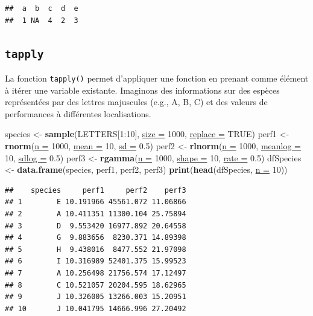 \documentclass[twoside,symmetric]{book}
\newenvironment{Shaded}{}{}
\newcommand{\DataTypeTok}[1]{\underline{#1}}
\newcommand{\DecValTok}[1]{#1}
\newcommand{\FloatTok}[1]{#1}
\newcommand{\KeywordTok}[1]{\textbf{#1}}
\newcommand{\NormalTok}[1]{#1}
\newcommand{\OperatorTok}[1]{#1}
\newcommand{\OtherTok}[1]{#1}
\newcommand{\StringTok}[1]{#1}
\begin{document}
\begin{verbatim}
##  a  b  c  d  e 
##  1 NA  4  2  3
\end{verbatim}

\hypertarget{l17tapply}{%
\subsection{\texorpdfstring{\texttt{tapply}}{tapply}}\label{l17tapply}}

La fonction \texttt{tapply()} permet d'appliquer une fonction en prenant comme élément à itérer une variable existante. Imaginons des informations sur des espèces représentées par des lettres majuscules (e.g., A, B, C) et des valeurs de performances à différentes localisations.

\begin{Shaded}
\begin{Highlighting}[]
\NormalTok{species <-}\StringTok{ }\KeywordTok{sample}\NormalTok{(LETTERS[}\DecValTok{1}\OperatorTok{:}\DecValTok{10}\NormalTok{], }\DataTypeTok{size =} \DecValTok{1000}\NormalTok{, }\DataTypeTok{replace =} \OtherTok{TRUE}\NormalTok{)}
\NormalTok{perf1 <-}\StringTok{ }\KeywordTok{rnorm}\NormalTok{(}\DataTypeTok{n =} \DecValTok{1000}\NormalTok{, }\DataTypeTok{mean =} \DecValTok{10}\NormalTok{, }\DataTypeTok{sd =} \FloatTok{0.5}\NormalTok{)}
\NormalTok{perf2 <-}\StringTok{ }\KeywordTok{rlnorm}\NormalTok{(}\DataTypeTok{n =} \DecValTok{1000}\NormalTok{, }\DataTypeTok{meanlog =} \DecValTok{10}\NormalTok{, }\DataTypeTok{sdlog =} \FloatTok{0.5}\NormalTok{)}
\NormalTok{perf3 <-}\StringTok{ }\KeywordTok{rgamma}\NormalTok{(}\DataTypeTok{n =} \DecValTok{1000}\NormalTok{, }\DataTypeTok{shape =} \DecValTok{10}\NormalTok{, }\DataTypeTok{rate =} \FloatTok{0.5}\NormalTok{)}
\NormalTok{dfSpecies <-}\StringTok{ }\KeywordTok{data.frame}\NormalTok{(species, perf1, perf2, perf3)}
\KeywordTok{print}\NormalTok{(}\KeywordTok{head}\NormalTok{(dfSpecies, }\DataTypeTok{n =} \DecValTok{10}\NormalTok{))}
\end{Highlighting}
\end{Shaded}

\begin{verbatim}
##    species     perf1     perf2    perf3
## 1        E 10.191966 45561.072 11.06866
## 2        A 10.411351 11300.104 25.75894
## 3        D  9.553420 16977.892 20.64558
## 4        G  9.883656  8230.371 14.89398
## 5        H  9.438016  8477.552 21.97098
## 6        I 10.316989 52401.375 15.99523
## 7        A 10.256498 21756.574 17.12497
## 8        C 10.521057 20204.595 18.62965
## 9        J 10.326005 13266.003 15.20951
## 10       J 10.041795 14666.996 27.20492
\end{verbatim}
\end{document}
